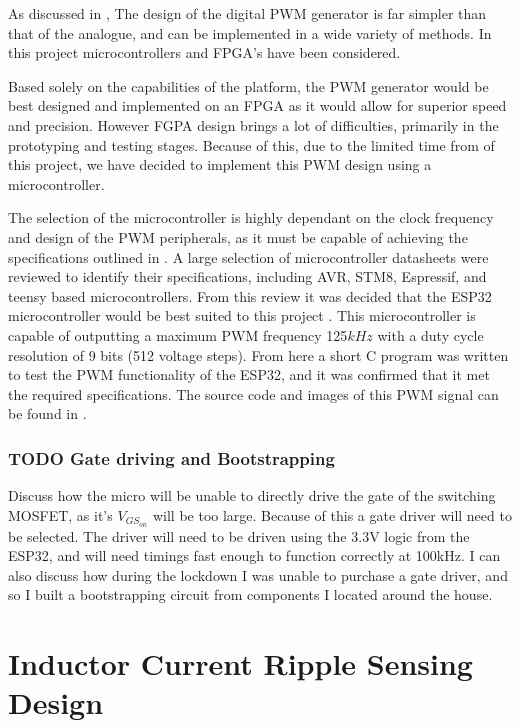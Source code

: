 As discussed in , The design of the digital PWM generator is far simpler than that of the analogue, and can be implemented in a wide variety of methods. In this project microcontrollers and FPGA's have been considered.

Based solely on the capabilities of the platform, the PWM generator would be best designed and implemented on an FPGA as it would allow for superior speed and precision. However FGPA design brings a lot of difficulties, primarily in the prototyping and testing stages. Because of this, due to the limited time from of this project, we have decided to implement this PWM design using a microcontroller.

The selection of the microcontroller is highly dependant on the clock frequency and design of the PWM peripherals, as it must be capable of achieving the specifications outlined in . A large selection of microcontroller datasheets were reviewed to identify their specifications, including AVR, STM8, Espressif, and teensy based microcontrollers. From this review it was decided that the ESP32 microcontroller would be best suited to this project \cite{ESP32Manual}. This microcontroller is capable of outputting a maximum PWM frequency 125$kHz$ with a duty cycle resolution of 9 bits (512 voltage steps). From here a short C program was written to test the PWM functionality of the ESP32, and it was confirmed that it met the required specifications. The source code and images of this PWM signal can be found in .

\subsubsection{TODO Gate driving and Bootstrapping} 

Discuss how the micro will be unable to directly drive the gate of the switching MOSFET, as it's $V_{GS_{on}}$ will be too large. Because of this a gate driver will need to be selected. The driver will need to be driven using the 3.3V logic from the ESP32, and will need timings fast enough to function correctly at 100kHz. I can also discuss how during the lockdown I was unable to purchase a gate driver, and so I built a bootstrapping circuit from components I located around the house. 
 





\section{Inductor Current Ripple Sensing Design}

